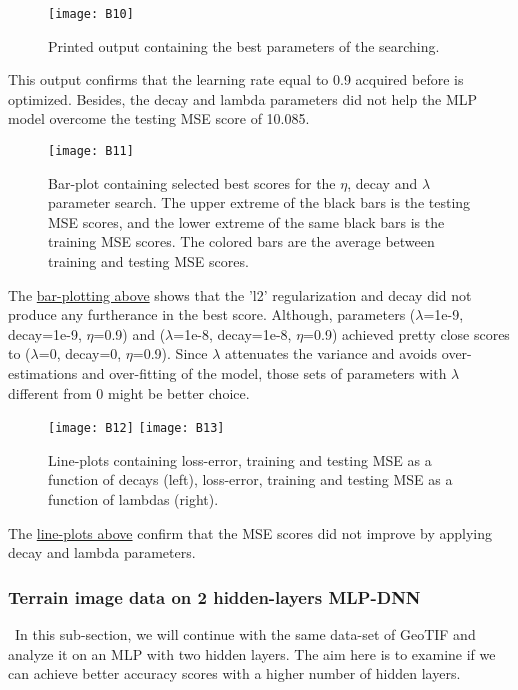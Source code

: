 \begin{figure}[H]
\label{fig:B7}
\centering
\texttt{[image: B10]}
\caption{Printed output containing the best parameters of the searching.}
\end{figure}

This output confirms that the learning rate equal to 0.9 acquired before is optimized. Besides, the decay and lambda parameters did not help the MLP model overcome the testing MSE score of 10.085.

\begin{figure}[H]
\label{fig:B8}
\centering
\texttt{[image: B11]}
\caption{Bar-plot containing selected best scores for the $\eta$, decay and $\lambda$ parameter search. The upper extreme of the black bars is the testing MSE scores, and the lower extreme of the same black bars is the training MSE scores. The colored bars are the average between training and testing MSE scores.}
\end{figure}

The \hyperref[fig:B8]{bar-plotting above} shows that the 'l2' regularization and decay did not produce any furtherance in the best score. Although, parameters ($\lambda$=1e-9, decay=1e-9, $\eta$=0.9) and ($\lambda$=1e-8, decay=1e-8, $\eta$=0.9) achieved pretty close scores to ($\lambda$=0, decay=0, $\eta$=0.9). Since $\lambda$ attenuates the variance and avoids over-estimations and over-fitting of the model, those sets of parameters with $\lambda$ different from 0 might be better choice.

\begin{figure}[H]
\label{fig:B9}
\centering
\texttt{[image: B12]}
\texttt{[image: B13]}
\caption{Line-plots containing loss-error, training and testing MSE as a function of decays (left), loss-error, training and testing MSE as a function of lambdas (right).}
\end{figure}

The \hyperref[fig:B9]{line-plots above} confirm that the MSE scores did not improve by applying decay and lambda parameters.

\subsubsection{Terrain image data on 2 hidden-layers MLP-DNN}
\label{chap:Terrain image data on 2 hidden-layers MLP-DNN}

\quad \, In this sub-section, we will continue with the same data-set of GeoTIF and analyze it on an MLP with two hidden layers. The aim here is to examine if we can achieve better accuracy scores with a higher number of hidden layers.\\


